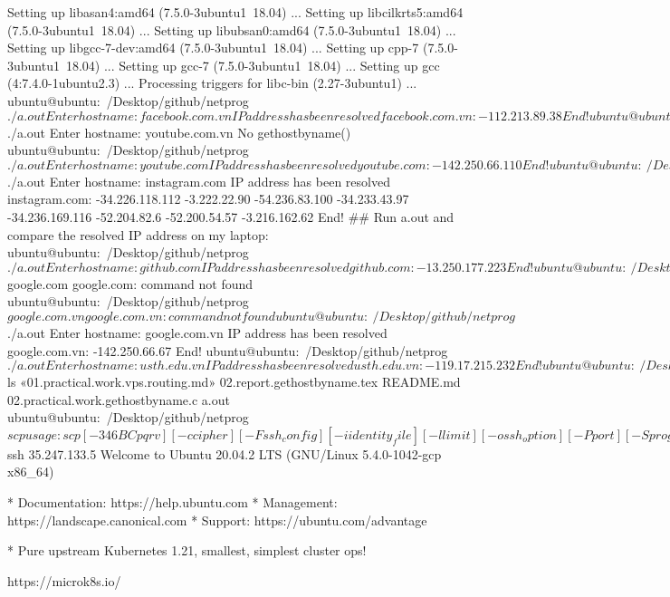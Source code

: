 Setting up libasan4:amd64 (7.5.0-3ubuntu1~18.04) ...
Setting up libcilkrts5:amd64 (7.5.0-3ubuntu1~18.04) ...
Setting up libubsan0:amd64 (7.5.0-3ubuntu1~18.04) ...
Setting up libgcc-7-dev:amd64 (7.5.0-3ubuntu1~18.04) ...
Setting up cpp-7 (7.5.0-3ubuntu1~18.04) ...
Setting up gcc-7 (7.5.0-3ubuntu1~18.04) ...
Setting up gcc (4:7.4.0-1ubuntu2.3) ...
Processing triggers for libc-bin (2.27-3ubuntu1) ...
ubuntu@ubuntu:~/Desktop/github/netprog$ ./a.out
Enter hostname: facebook.com.vn
IP address has been resolved facebook.com.vn:
	-112.213.89.38
 	End!
ubuntu@ubuntu:~/Desktop/github/netprog$ ./a.out
Enter hostname: youtube.com.vn
No gethostbyname()
ubuntu@ubuntu:~/Desktop/github/netprog$ ./a.out
Enter hostname: youtube.com
IP address has been resolved youtube.com:
	-142.250.66.110
 	End!

ubuntu@ubuntu:~/Desktop/github/netprog$ ./a.out
Enter hostname: instagram.com
IP address has been resolved instagram.com:
	-34.226.118.112
 	-3.222.22.90
 	-54.236.83.100
 	-34.233.43.97
 	-34.236.169.116
 	-52.204.82.6
 	-52.200.54.57
 	-3.216.162.62
 	End!
## Run a.out and compare the resolved IP address on my laptop: 
ubuntu@ubuntu:~/Desktop/github/netprog$ ./a.out
Enter hostname: github.com
IP address has been resolved github.com:
	-13.250.177.223
 	End!
ubuntu@ubuntu:~/Desktop/github/netprog$ google.com
google.com: command not found
ubuntu@ubuntu:~/Desktop/github/netprog$ google.com.vn
google.com.vn: command not found
ubuntu@ubuntu:~/Desktop/github/netprog$ ./a.out
Enter hostname: google.com.vn
IP address has been resolved google.com.vn:
	-142.250.66.67
 	End!
ubuntu@ubuntu:~/Desktop/github/netprog$ ./a.out
Enter hostname: usth.edu.vn
IP address has been resolved usth.edu.vn:
	-119.17.215.232
 	End!
ubuntu@ubuntu:~/Desktop/github/netprog$ ls
«01.practical.work.vps.routing.md»  02.report.gethostbyname.tex  README.md
02.practical.work.gethostbyname.c   a.out
ubuntu@ubuntu:~/Desktop/github/netprog$ scp
usage: scp [-346BCpqrv] [-c cipher] [-F ssh_config] [-i identity_file]
           [-l limit] [-o ssh_option] [-P port] [-S program]
           [[user@]host1:]file1 ... [[user@]host2:]file2
ubuntu@ubuntu:~/Desktop/github/netprog$ ssh 35.247.133.5
Welcome to Ubuntu 20.04.2 LTS (GNU/Linux 5.4.0-1042-gcp x86_64)

 * Documentation:  https://help.ubuntu.com
 * Management:     https://landscape.canonical.com
 * Support:        https://ubuntu.com/advantage

 * Pure upstream Kubernetes 1.21, smallest, simplest cluster ops!

     https://microk8s.io/

